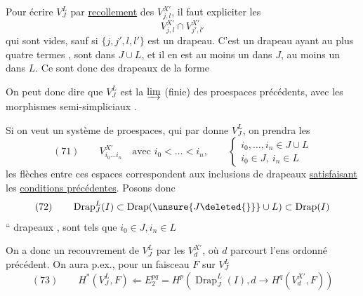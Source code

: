 
Pour écrire $V_J^L$ par \uline{recollement} des $V_{j,l}^{X'}$, il faut expliciter les
\[
V_{j,l}^{X'}\cap V_{j',l'}^{X'}
\]
qui sont vides, sauf si $\{j,j',l,l'\}$ est un drapeau. C'est un drapeau  ayant au plus quatre termes ,   sont dans $J\cup L$, et il en est au  moins un dans $J$, au moins un dans $L$. Ce sont donc des drapeaux de la forme



On peut donc dire que $V_J^L$ est la $\varinjlim$ (finie) des proespaces précédents, avec  les morphismes semi-simpliciaux  .

Si on veut un système  de proespaces,  qui par  \inserted{$\varinjlim$} donne $V_J^L$, on prendra les
\[
(71)\qquad V_{i_0\ldots i_n}^{X'}\quad\text{avec }i_0<\ldots<i_n,\qquad
\left\{\begin{array}{l}
i_0,\ldots,i_n\in J\cup L\\
i_0\in J,\ i_n\in L
\end{array}\right.
\]
les flèches entre ces espaces correspondent aux inclusions de drapeaux \uline{satisfaisant} les \uline{conditions précédentes}. Posons donc
\[
(72)\qquad\operatorname{Drap}_J^L(I)\subset\operatorname{Drap}(\unsure{J\deleted{\}}}\cup L)\subset\operatorname{Drap}(I)
\]
`` drapeaux ,  sont tels que $i_0\in J,i_n\in L$

On a donc un recouvrement de $V_J^L$ par les $V_d^{X'}$, où $d$ parcourt l'ens ordonné précédent. On aura p.ex., pour un faisceau $F$ sur $V_J^L$
\[
(73)\qquad H^*(V_J^L,F)\Longleftarrow E_2^{pq}=H^p(\operatorname{Drap}_J^L(I),d\to H^q(V_d^{X'},F))
\]
